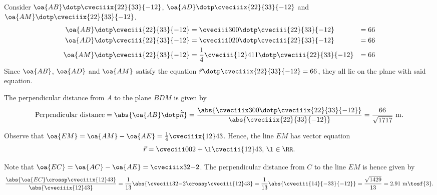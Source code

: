 \begin{solution}
\begin{ppart}
        Consider $\oa{AB} \dotp \cveciiix{22}{33}{-12}$, $\oa{AD} \dotp \cveciiix{22}{33}{-12}$ and $\oa{AM} \dotp \cveciiix{22}{33}{-12}$.
        \begin{alignat*}{2}
            \oa{AB} \dotp \cveciii{22}{33}{-12} &= \cveciii300 \dotp \cveciii{22}{33}{-12} &= 66\\
            \oa{AD} \dotp \cveciii{22}{33}{-12} &= \cveciii020 \dotp \cveciii{22}{33}{-12} &= 66\\
            \oa{AM} \dotp \cveciii{22}{33}{-12} &= \frac14\cveciii{12}4{11} \dotp \cveciii{22}{33}{-12} &= 66
        \end{alignat*}            
        Since $\oa{AB}$, $\oa{AD}$ and $\oa{AM}$ satisfy the equation $\vec r \dotp \cveciiix{22}{33}{-12} = 66$, they all lie on the plane with said equation.
    \end{ppart}
    \begin{ppart}
        The perpendicular distance from $A$ to the plane $BDM$ is given by \[\text{Perpendicular distance} = \abs{\oa{AB} \dotp \hat{\vec n}} = \frac{\abs{\cveciiix300 \dotp \cveciiix{22}{33}{-12}}}{\abs{\cveciiix{22}{33}{-12}}} = \frac{66}{\sqrt{1717}} \text{ m}.\]
    \end{ppart}
    \begin{ppart}
        Observe that $\oa{EM} = \oa{AM} - \oa{AE} = \frac14 \cveciiix{12}43$. Hence, the line $EM$ has vector equation \[\vec r = \cveciii002 + \l \cveciii{12}43, \, \l \in \RR.\]
    \end{ppart}
    \begin{ppart}
        Note that $\oa{EC} = \oa{AC} - \oa{AE} = \cveciiix32{-2}$. The perpendicular distance from $C$ to the line $EM$ is hence given by \[\frac{\abs{\oa{EC} \crossp \cveciiix{12}43}}{\abs{\cveciiix{12}43}} = \frac1{13} \abs{\cveciii32{-2} \crossp \cveciii{12}43} = \frac1{13} \abs{\cveciii{14}{-33}{-12}} = \frac{\sqrt{1429}}{13} = 2.91 \text{ m}\tosf{3}.\]
    \end{ppart}
\end{solution}

